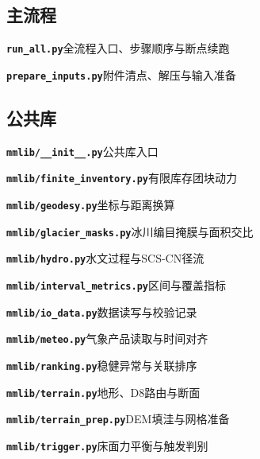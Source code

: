 \subsection*{主流程}
\noindent\textbf{\texttt{run\_all.py}}\quad 全流程入口、步骤顺序与断点续跑\par\nopagebreak

\noindent\textbf{\texttt{prepare\_inputs.py}}\quad 附件清点、解压与输入准备\par\nopagebreak


\subsection*{公共库}
\noindent\textbf{\texttt{mmlib/\_\_init\_\_.py}}\quad 公共库入口\par\nopagebreak

\noindent\textbf{\texttt{mmlib/finite\_inventory.py}}\quad 有限库存团块动力\par\nopagebreak

\noindent\textbf{\texttt{mmlib/geodesy.py}}\quad 坐标与距离换算\par\nopagebreak

\noindent\textbf{\texttt{mmlib/glacier\_masks.py}}\quad 冰川编目掩膜与面积交比\par\nopagebreak

\noindent\textbf{\texttt{mmlib/hydro.py}}\quad 水文过程与SCS-CN径流\par\nopagebreak

\noindent\textbf{\texttt{mmlib/interval\_metrics.py}}\quad 区间与覆盖指标\par\nopagebreak

\noindent\textbf{\texttt{mmlib/io\_data.py}}\quad 数据读写与校验记录\par\nopagebreak

\noindent\textbf{\texttt{mmlib/meteo.py}}\quad 气象产品读取与时间对齐\par\nopagebreak

\noindent\textbf{\texttt{mmlib/ranking.py}}\quad 稳健异常与关联排序\par\nopagebreak

\noindent\textbf{\texttt{mmlib/terrain.py}}\quad 地形、D8路由与断面\par\nopagebreak

\noindent\textbf{\texttt{mmlib/terrain\_prep.py}}\quad DEM填洼与网格准备\par\nopagebreak

\noindent\textbf{\texttt{mmlib/trigger.py}}\quad 床面力平衡与触发判别\par\nopagebreak



